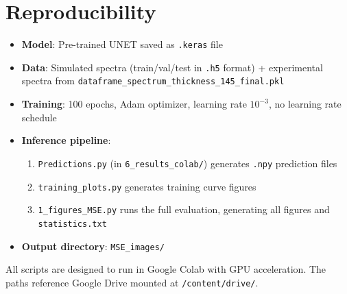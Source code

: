 \documentclass[11pt,a4paper]{article}
\begin{document}
\section{Reproducibility}

\begin{itemize}
  \item \textbf{Model}: Pre-trained UNET saved as \texttt{.keras} file
  \item \textbf{Data}: Simulated spectra (train/val/test in \texttt{.h5} format) + experimental spectra from \texttt{dataframe\_spectrum\_thickness\_145\_final.pkl}
  \item \textbf{Training}: 100 epochs, Adam optimizer, learning rate $10^{-3}$, no learning rate schedule
  \item \textbf{Inference pipeline}:
  \begin{enumerate}
    \item \texttt{Predictions.py} (in \texttt{6\_results\_colab/}) generates \texttt{.npy} prediction files
    \item \texttt{training\_plots.py} generates training curve figures
    \item \texttt{1\_figures\_MSE.py} runs the full evaluation, generating all figures and \texttt{statistics.txt}
  \end{enumerate}
  \item \textbf{Output directory}: \texttt{MSE\_images/}
\end{itemize}

All scripts are designed to run in Google Colab with GPU acceleration. The paths reference Google Drive mounted at \texttt{/content/drive/}.
\end{document}
